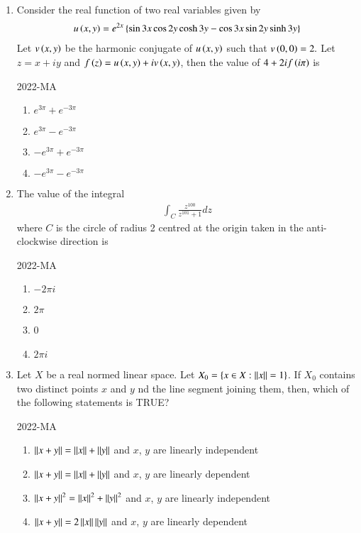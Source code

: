 \documentclass[journal,12pt,onecolumn]{IEEEtran}
\theoremstyle{remark}
\begin{document}
\begin{enumerate}
\item Consider the real function of two real variables given by
	\begin{align*}
		u\left(x,y\right)=e^{2x}\left\{\sin 3x \cos 2y \cosh 3y - \cos 3x \sin 2y \sinh 3y\right\}
	\end{align*}
Let $v\left(x,y\right)$ be the harmonic conjugate of $u\left(x,y\right)$ such that $v\left(0,0\right)=2.$ Let $z=x+iy$ and $f\left(z\right)=u\left(x,y\right)+iv\left(x,y\right)$, then the value of $4+2if\left(i \pi\right)$ is

		\hfill{2022-MA}

	\begin{enumerate}
		\item $e^{3 \pi}+e^{-3 \pi}$
		\item $e^{3 \pi}-e^{-3 \pi}$
		\item $-e^{3 \pi}+e^{-3 \pi}$
		\item $-e^{3 \pi}-e^{-3 \pi}$
	\end{enumerate}

\item The value of the integral 
	\begin{align*}
		\int_{C} \frac{z^{100}}{z^{101}+1} dz
	\end{align*}
	where $C$ is the circle of radius 2 centred at the origin taken in the anti-clockwise
direction is

		\hfill{2022-MA}

	\begin{enumerate}
		\item $-2 \pi i$
		\item $2 \pi$
		\item 0
		\item $2 \pi i$
	\end{enumerate}

\item Let $X$ be a real normed linear space. Let $X_0 = \left\{ x \in X: \left\lVert x\right\rVert=1\right\}$. If $X_0$ contains two distinct points $x$ and $y$ nd the line segment joining them, then, which of the following statements is TRUE?
	
	\hfill{2022-MA}

	\begin{enumerate}
		\item $\left\lVert x+y\right\rVert=\left\lVert x\right\rVert+\left\lVert y\right\rVert$ and $x$, $y$ are linearly independent
		\item $\left\lVert x+y\right\rVert=\left\lVert x\right\rVert+\left\lVert y\right\rVert$ and $x$, $y$ are linearly dependent
		\item $\left\lVert x+y\right\rVert^{2}=\left\lVert x\right\rVert^{2}+\left\lVert y\right\rVert^{2}$ and $x$, $y$ are linearly independent
		\item $\left\lVert x+y\right\rVert=2\left\lVert x\right\rVert \left\lVert y\right\rVert$ and $x$, $y$ are linearly dependent
	\end{enumerate}


\end{enumerate}
\end{document}
